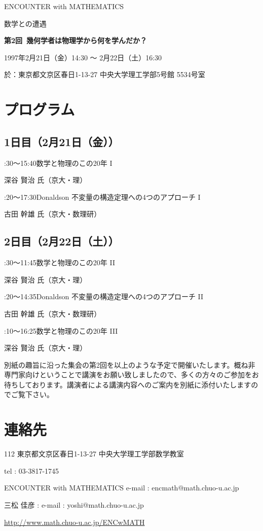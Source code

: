 \documentclass[uplatex,dvipdfmx]{jlreq}
\newcommand{\talk}[3]{%
\noindent
#1\quad #2\par
\hspace*{2em}#3\par\smallskip
}
\newcommand{\EwMnumber}{第2回}
\newcommand{\EwMtitle}{幾何学者は物理学から何を学んだか？}
\newcommand{\EwMdate}{1997年2月21日（金）14:30 ～ 2月22日（土）16:30}
\newcommand{\EwMplace}{東京都文京区春日1-13-27 中央大学理工学部5号館 5534号室}
\newcommand{\EwMtitleblock}{

\vspace*{-5mm}

\begin{center}

{\Large ENCOUNTER with MATHEMATICS}

\vspace{2mm}

{\large 数学との遭遇}

\vspace{4mm}

{\Large \bfseries \EwMnumber\ \EwMtitle}

\vspace{4mm}

\EwMdate

\vspace{2mm}

於：\EwMplace

\end{center}

\vspace{3mm}

\vspace{2mm}

}
\begin{document}
\EwMtitleblock


\section*{プログラム}

\subsection*{1日目（2月21日（金））}

\talk
{14:30～15:40}
{数学と物理のこの20年 I}
{深谷 賢治 氏（京大・理）}

\talk
{16:20～17:30}
{Donaldson 不変量の構造定理への4つのアプローチ I}
{古田 幹雄 氏（京大・数理研）}

\subsection*{2日目（2月22日（土））}

\talk
{10:30～11:45}
{数学と物理のこの20年 II}
{深谷 賢治 氏（京大・理）}

\talk
{13:20～14:35}
{Donaldson 不変量の構造定理への4つのアプローチ II}
{古田 幹雄 氏（京大・数理研）}

\talk
{15:10～16:25}
{数学と物理のこの20年 III}
{深谷 賢治 氏（京大・理）}


\bigskip

別紙の趣旨に沿った集会の第2回を以上のような予定で開催いたします。概ね非専門家向けということで講演をお願い致しましたので、多くの方々のご参加をお待ちしております。講演者による講演内容へのご案内を別紙に添付いたしますのでご覧下さい。


\section*{連絡先}

112 東京都文京区春日1-13-27 中央大学理工学部数学教室

tel : 03-3817-1745

ENCOUNTER with MATHEMATICS  
e-mail : encmath@math.chuo-u.ac.jp  

三松 佳彦 : e-mail : yoshi@math.chuo-u.ac.jp  

\url{http://www.math.chuo-u.ac.jp/ENCwMATH}
\end{document}
